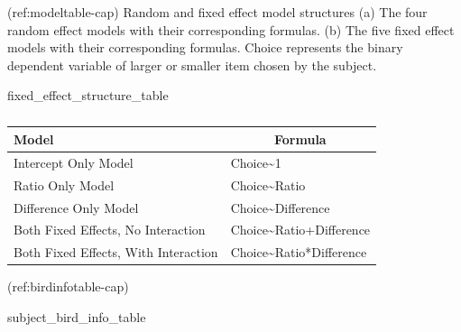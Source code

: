 \documentclass[
]{article}
\newenvironment{Shaded}{\begin{snugshade}}{\end{snugshade}}
\newcommand{\NormalTok}[1]{#1}
\begin{document}
(ref:modeltable-cap) Random and fixed effect model structures (a) The
four random effect models with their corresponding formulas. (b) The
five fixed effect models with their corresponding formulas. Choice
represents the binary dependent variable of larger or smaller item
chosen by the subject.

\begin{Shaded}
\begin{Highlighting}[]
\NormalTok{fixed\_effect\_structure\_table}
\end{Highlighting}
\end{Shaded}

\begin{table}[tbp]

\begin{center}
\begin{threeparttable}

\caption{\label{tab:unnamed-chunk-1}}

\begin{tabular}{ll}
\toprule
Model & \multicolumn{1}{c}{Formula}\\
\midrule
Intercept Only Model & Choice\textasciitilde{}1\\
Ratio Only Model & Choice\textasciitilde{}Ratio\\
Difference Only Model & Choice\textasciitilde{}Difference\\
Both Fixed Effects, No Interaction & Choice\textasciitilde{}Ratio+Difference\\
Both Fixed Effects, With Interaction & Choice\textasciitilde{}Ratio*Difference\\
\bottomrule
\end{tabular}

\end{threeparttable}
\end{center}

\end{table}

(ref:birdinfotable-cap)

\begin{Shaded}
\begin{Highlighting}[]
\NormalTok{subject\_bird\_info\_table}
\end{Highlighting}
\end{Shaded}
\end{document}

